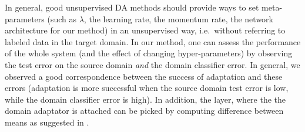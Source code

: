 \vspace{2mm} 
In general, good unsupervised DA methods should provide ways to set meta-parameters (such as $\lambda$, the learning rate, the momentum rate, the network architecture for our method) in an unsupervised way, i.e.\ without referring to labeled data in the target domain. %
In our method, one can assess the performance of the whole system (and the effect of changing hyper-parameters) by observing the test error on the source domain {\em and} the domain classifier error. In general, we observed a good correspondence between the success of adaptation and these errors (adaptation is more successful when the source domain test error is low, while the domain classifier error is high).
In addition, the layer, where the the domain adaptator is attached can be picked by computing difference between means as suggested in \cite{Tzeng14}. 


